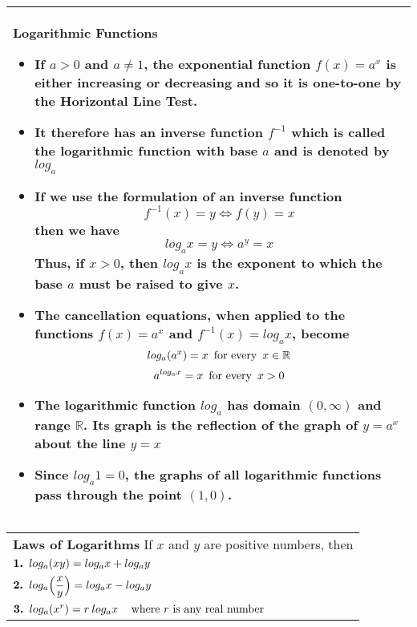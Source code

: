 \documentclass[fleqn]{article}
\begin{document}
\begin{center}
\def\arraystretch{1.3}
{\setlength{\tabcolsep}{16pt}
\begin{tabularx}{.9\textwidth}{|X|}
\hline
	\vspace{1pt}
	\textbf{Logarithmic Functions}
	\begin{itemize}
	\item If $a>0$ and $a \ne 1$, the exponential function $f(x) = a^x$ is either increasing or decreasing and so it is one-to-one by the Horizontal Line Test.  
	\item It therefore has an inverse function $f^{-1}$ which is called the \textbf{logarithmic function with base $a$} and is denoted by $log_a$
	\item If we use the formulation of an inverse function
	$$f^{-1}(x) = y \Leftrightarrow f(y) = x$$
	then we have
	$$log_ax = y \Leftrightarrow a^y = x$$
	Thus, if $x>0$, then $log_ax$ is the exponent to which the base $a$ must be raised to give $x$.
	\item The cancellation equations, when applied to the functions $f(x) = a^x$ and $f^{-1}(x) = log_ax$, become
	$$log_a(a^x) = x \text{\hspace{5pt}for every\hspace{5pt}} x \in \mathbb{R}$$
	$$a^{log_ax} = x \text{\hspace{5pt}for every\hspace{5pt}} x > 0$$
	\item The logarithmic function $log_a$ has domain $(0, \infty)$ and range $\mathbb{R}$. Its graph is the reflection of the graph of $y = a^x$ about the line $y = x$
	\item Since $log_a 1 = 0$, the graphs of all logarithmic functions pass through the point $(1,0)$.
	\end{itemize}
	\\[6pt]
\hline
\end{tabularx}}
\vspace{12pt}

\def\arraystretch{1.3}
{\setlength{\tabcolsep}{16pt}
\begin{tabularx}{.9\textwidth}{|X|}
\hline
	\vspace{1pt}
	\textbf{Laws of Logarithms} \:\: If $x$ and $y$ are positive numbers, then \\[10pt]
	$\text{\textbf{1. }} log_a(xy) = log_ax + log_ay$ \\[10pt]
	$\text{\textbf{2. }} log_a \Big( \dfrac{x}{y} \Big) = log_ax - log_ay$ \\[10pt]
	$\text{\textbf{3. }} log_a(x^r) = r \: log_ax \hspace{12pt} \text{where $r$ is any real number}$
	\\[18pt]
\hline
\end{tabularx}}
\vspace{12pt}


\end{center}
\end{document}
